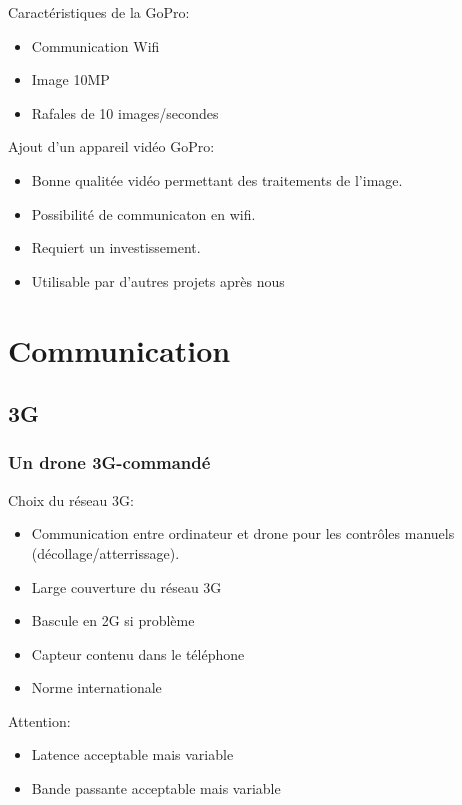\documentclass[transparent]{beamer}
\begin{document}
\begin{frame}
	\begin{block}{Caractéristiques de la GoPro:}
			\begin{itemize}
				\item Communication Wifi
				\item Image 10MP
				\item Rafales de 10 images/secondes
			\end{itemize}
	\end{block}
	\begin{block}{Ajout d'un appareil vidéo GoPro:}
			\begin{itemize}
				\item Bonne qualitée vidéo permettant des traitements de l'image.
				\item Possibilité de communicaton en wifi.
				\item Requiert un investissement.
				\item Utilisable par d'autres projets après nous
			\end{itemize}
	\end{block}
\end{frame}

\section{Communication}
\subsection{3G}

\begin{frame}
\frametitle{Un drone 3G-commandé}
	\begin{block}{Choix du réseau 3G:}
		\begin{itemize}
			\item Communication entre ordinateur et drone pour les contrôles manuels (décollage/atterrissage).
			\item Large couverture du réseau 3G
			\item Bascule en 2G si problème
			\item Capteur contenu dans le téléphone
			\item Norme internationale
		\end{itemize}
	\end{block}
	\begin{block}{Attention:}
		\begin{itemize}
			\item Latence acceptable mais variable
			\item Bande passante acceptable mais variable
		\end{itemize}
	\end{block}
\end{frame}
\end{document}
